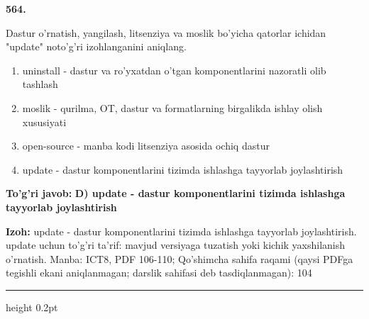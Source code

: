 \documentclass[10pt,a4paper]{article}
\begin{document}
{\bfseries\sffamily\color{ink} 564.}
\par
Dastur o'rnatish, yangilash, litsenziya va moslik bo'yicha qatorlar ichidan "update" noto'g'ri izohlanganini aniqlang.
\begin{enumerate}[label=\Alph*),leftmargin=9mm]
\item uninstall - dastur va ro'yxatdan o'tgan komponentlarini nazoratli olib tashlash
\item moslik - qurilma, OT, dastur va formatlarning birgalikda ishlay olish xususiyati
\item open-source - manba kodi litsenziya asosida ochiq dastur
\item update - dastur komponentlarini tizimda ishlashga tayyorlab joylashtirish
\end{enumerate}
\begin{tcolorbox}[enhanced,breakable,colback=teal!4,colframe=teal!60!black,boxrule=0.45pt,arc=1.2mm,left=2.7mm,right=2.7mm,top=1.8mm,bottom=1.8mm,before skip=2mm,after skip=2mm]
{\bfseries\sffamily\color{teal}To'g'ri javob:} \textbf{D) update - dastur komponentlarini tizimda ishlashga tayyorlab joylashtirish}
\par\smallskip
{\bfseries Izoh:} update - dastur komponentlarini tizimda ishlashga tayyorlab joylashtirish. update uchun to'g'ri ta'rif: mavjud versiyaga tuzatish yoki kichik yaxshilanish o'rnatish. Manba: ICT8, PDF 106-110; Qo'shimcha sahifa raqami (qaysi PDFga tegishli ekani aniqlanmagan; darslik sahifasi deb tasdiqlanmagan): 104
\end{tcolorbox}
\vspace{2mm}\hrule height 0.2pt\vspace{3mm}
\end{document}
